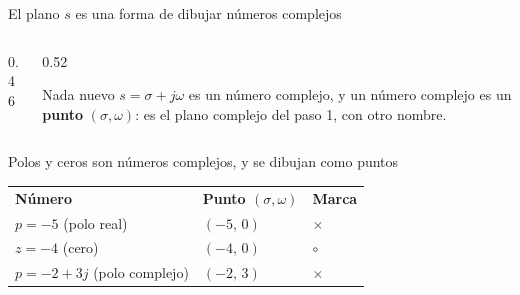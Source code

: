 \documentclass[aspectratio=169,11pt]{beamer}
\begin{document}
\begin{frame}{El plano $s$ es una forma de dibujar números complejos}
  \footnotesize
  \setlength{\parskip}{1pt}
  \begin{columns}[T]
    \begin{column}{0.46\textwidth}
      \centering
    \end{column}
    \begin{column}{0.52\textwidth}
      \begin{block}{Nada nuevo}
        $s=\sigma+j\omega$ es un número complejo, y un número complejo es un \textbf{punto} $(\sigma,\omega)$: es el plano complejo del paso 1, con otro nombre.
      \end{block}
    \end{column}
  \end{columns}

  \begin{block}{Polos y ceros son números complejos, y se dibujan como puntos}
    \renewcommand{\arraystretch}{1.15}
    \begin{tabular}{lll}
      \textbf{Número} & \textbf{Punto $(\sigma,\omega)$} & \textbf{Marca} \\
      $p=-5$ (polo real) & $(-5,\,0)$ & $\times$ \\
      $z=-4$ (cero) & $(-4,\,0)$ & $\circ$ \\
      $p=-2+3j$ (polo complejo) & $(-2,\,3)$ & $\times$ \\
    \end{tabular}
  \end{block}

\end{frame}
\end{document}
